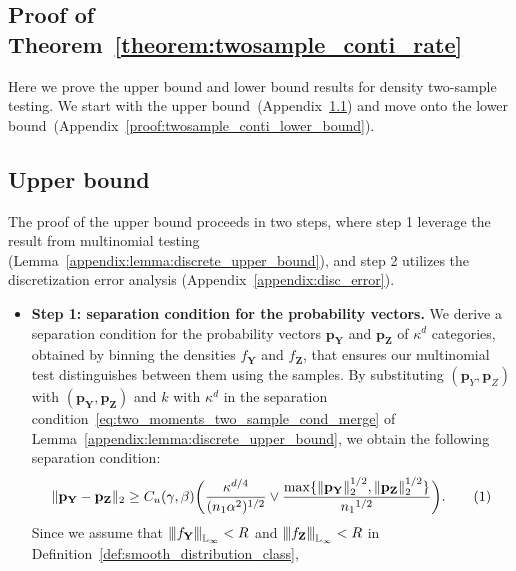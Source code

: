 \documentclass[twoside,11pt]{article}
\newcommand\numberthis{\addtocounter{equation}{1}\tag{\theequation}}
\newcommand{\vertiii}[1]{
	{\left\vert\kern-0.25ex\left\vert\kern-0.25ex\left\vert #1 
		\right\vert\kern-0.25ex\right\vert\kern-0.25ex\right\vert}
}%
\newcommand{\rvTwo}{Y}
\newcommand{\rvThree}{Z}
\newcommand{\vectorize}[1]{\mathbf{#1}}
\newcommand{\dimDensity}{d} %
\newcommand{\alphabetSize}{k} %
\newcommand{\sampleSize}{n}
\newcommand{\probVec}{\mathbf{p}} %
\newcommand{\ballRadius}{R}
\newcommand{\privacyParameter}{\alpha} %
\newcommand{\maxErrorTypeTwo}{\beta} %
\newcommand{\maxErrorTypeOne}{\gamma} %
\newcommand{\binNum}{\kappa}           %
\begin{document}
\begin{appendix}
	\section{Proof of Theorem~\ref{theorem:twosample_conti_rate}}\label{proof:twosample_conti_rates}
	Here we prove the upper bound and lower bound results for density two-sample testing.
	We start with the upper bound~(Appendix~\ref{proof_theorem:twosample_conti_rate}) and move onto the lower bound~(Appendix~\ref{proof:twosample_conti_lower_bound}).
	\subsection{Upper bound}\label{proof_theorem:twosample_conti_rate}
	The proof of the upper bound  proceeds in two steps, where step 1 leverage the result from multinomial testing (Lemma~\ref{appendix:lemma:discrete_upper_bound}), and step 2 utilizes the discretization error analysis (Appendix~\ref{appendix:disc_error}).
	\begin{itemize}
	\item \textbf{Step 1: separation condition for the probability vectors.}
	We derive a separation condition for the probability vectors $\probVec_{\vectorize{\rvTwo}}$ and $\probVec_{\vectorize{\rvThree}}$ of $\binNum^\dimDensity$ 
	categories, obtained by binning the densities $f_{\vectorize{\rvTwo}}$ and $f_{\vectorize{\rvThree}}$, that ensures our multinomial test distinguishes between them using the samples. By substituting $(\probVec_{{\rvTwo}}, \probVec_{{\rvThree}})$ with $(\probVec_{\vectorize{\rvTwo}}, \probVec_{\vectorize{\rvThree}})$ 
	and $\alphabetSize$ with $\binNum^\dimDensity$ in the separation condition~\eqref{eq:two_moments_two_sample_cond_merge} of Lemma~\ref{appendix:lemma:discrete_upper_bound}, we obtain the  following separation condition:
	\begin{align*}
		\| \probVec_{\vectorize{\rvTwo}} - \probVec_{\vectorize{\rvThree}} \|_2
		\geq
		C_u( \maxErrorTypeOne, \maxErrorTypeTwo)
		\biggl(
		\frac
		{
			\binNum^{\dimDensity/4}
		}
		{(\sampleSize_1 \privacyParameter^2)^{1/2}} 
		\vee
		\frac
		{ \max\{
			\| \probVec_{\vectorize{\rvTwo}} \|^{1/2}_2, 
			\| \probVec_{\vectorize{\rvThree}} \|^{1/2}_2
			\}}
		{{\sampleSize_1}^{1/2}}
		\biggr).
		\numberthis \label{twosample_upper_conti_start}
	\end{align*}
	Since we assume that 
	$\vertiii{f_{\vectorize{Y}}}_{\mathbb{L}_\infty} < \ballRadius$ and
	$\vertiii{f_{\vectorize{Z}}}_{\mathbb{L}_\infty} < \ballRadius$ in Definition~\ref{def:smooth_distribution_class},

\end{itemize}
\end{appendix}
\end{document}
